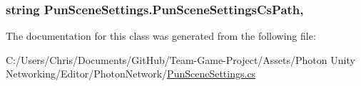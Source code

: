 \subsubsection[{\texorpdfstring{Pun\+Scene\+Settings\+Cs\+Path}{PunSceneSettingsCsPath}}]{\setlength{\rightskip}{0pt plus 5cm}string Pun\+Scene\+Settings.\+Pun\+Scene\+Settings\+Cs\+Path\hspace{0.3cm}{\ttfamily [static]}, {\ttfamily [get]}}\hypertarget{class_pun_scene_settings_a96a96fc88a6e8b6919d04f833b7e0cb3}{}\label{class_pun_scene_settings_a96a96fc88a6e8b6919d04f833b7e0cb3}


The documentation for this class was generated from the following file\+:\begin{DoxyCompactItemize}
\item 
C\+:/\+Users/\+Chris/\+Documents/\+Git\+Hub/\+Team-\/\+Game-\/\+Project/\+Assets/\+Photon Unity Networking/\+Editor/\+Photon\+Network/\hyperlink{_pun_scene_settings_8cs}{Pun\+Scene\+Settings.\+cs}\end{DoxyCompactItemize}
